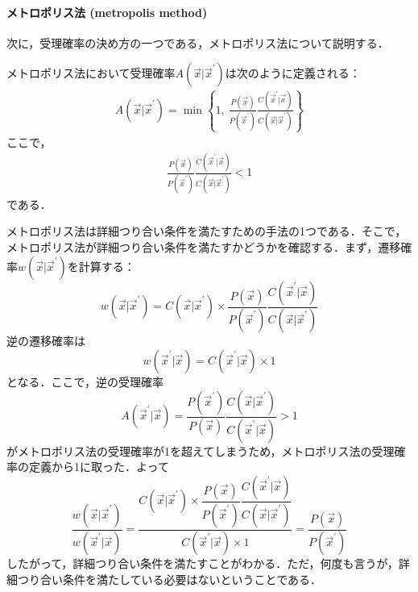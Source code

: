 \paragraph{メトロポリス法 (metropolis method)}
次に，受理確率の決め方の一つである，メトロポリス法について説明する．
\begin{kotak}
	\begin{definition}[メトロポリス法]
	メトロポリス法において受理確率$A(\vec{x}|\vec{x}^\prime)$は次のように定義される：
	\begin{align}
	    A(\vec{x}|\vec{x}^\prime)
     =\min\left\{
     1,\ \frac{P(\vec{x})}{P(\vec{x}^\prime)}
     \frac{C(\vec{x}^\prime|\vec{x})}{C(\vec{x}|\vec{x}^\prime)}
     \right\}
	\end{align}
    ここで，
    \begin{align}
	    \frac{P(\vec{x})}{P(\vec{x}^\prime)}
     \frac{C(\vec{x}^\prime|\vec{x})}{C(\vec{x}|\vec{x}^\prime)} < 1
	\end{align}
    である．
	\end{definition}
\end{kotak}
メトロポリス法は詳細つり合い条件を満たすための手法の1つである．そこで，メトロポリス法が詳細つり合い条件を満たすかどうかを確認する．まず，遷移確率$w(\vec{x}|\vec{x}^\prime)$を計算する：
\begin{equation}
    w(\vec{x}|\vec{x}^\prime)
    =C(\vec{x}|\vec{x}^\prime)\times
    \frac{P(\vec{x})}{P(\vec{x}^\prime)}
     \frac{C(\vec{x}^\prime|\vec{x})}{C(\vec{x}|\vec{x}^\prime)}
\end{equation}
逆の遷移確率は
\begin{equation}
    w(\vec{x}^\prime|\vec{x})
    =C(\vec{x}^\prime|\vec{x})\times
    1
\end{equation}
となる．ここで，逆の受理確率
\begin{equation}
    A(\vec{x}^\prime|\vec{x})=
    \frac{P(\vec{x}^\prime)}{P(\vec{x})}
     \frac{C(\vec{x}|\vec{x}^\prime)}{C(\vec{x}^\prime|\vec{x})} > 1
\end{equation}
がメトロポリス法の受理確率が1を超えてしまうため，メトロポリス法の受理確率の定義から1に取った．よって
\begin{equation}
    \frac{w(\vec{x}|\vec{x}^\prime)}{w(\vec{x}^\prime|\vec{x})}
    =\frac{
    C(\vec{x}|\vec{x}^\prime)\times
    \dfrac{P(\vec{x})}{P(\vec{x}^\prime)}
     \dfrac{C(\vec{x}^\prime|\vec{x})}{C(\vec{x}|\vec{x}^\prime)}
    }{
    C(\vec{x}^\prime|\vec{x})\times1
    }
    = \dfrac{P(\vec{x})}{P(\vec{x}^\prime)}
\end{equation}
したがって，詳細つり合い条件を満たすことがわかる．ただ，何度も言うが，詳細つり合い条件を満たしている必要はないということである．

